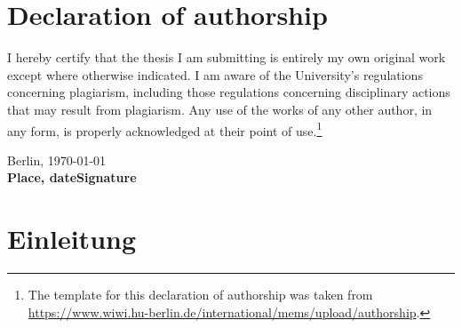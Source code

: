 \documentclass[12pt,twoside]{book}
\newcommand\blankpage{%
    \null
    \thispagestyle{empty}%
    \addtocounter{page}{-1}%
    \newpage}
\begin{document}


\chapter*{Declaration of authorship}

I hereby certify that the thesis I am submitting is entirely my own original work except where otherwise indicated. I am aware of the University's regulations concerning plagiarism, including those regulations concerning disciplinary actions that may result from plagiarism. Any use of the works of any other author, in any form, is properly acknowledged at their point of use.\footnote{The template for this declaration of authorship was taken from \url{https://www.wiwi.hu-berlin.de/international/mems/upload/authorship}.}

\vspace{2cm}

Berlin, \today\\
\textbf{Place, date}\hfill\textbf{Signature}

\tableofcontents
\newpage


\chapter{Einleitung}
\end{document}
